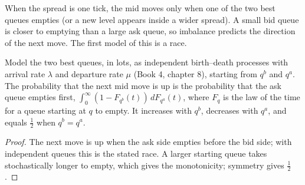 \begin{omfigure}

\label{fig:rs:order-book-features:book}
\end{omfigure}

When the spread is one tick, the mid moves only when one of the two best queues empties (or a new level appears inside a wider
spread). A small bid queue is closer to emptying than a large ask queue, so imbalance predicts the direction of the next move.
The first model of this is a race.

\begin{proposition}\label{prop:rs:order-book-features:race}
Model the two best queues, in lots, as independent birth--death processes with arrival rate $\lambda$ and departure rate $\mu$
(Book 4, chapter 8), starting from $q^b$ and $q^a$. The probability that the next mid move is up is the probability that the ask
queue empties first, $\int_0^\infty(1 - F_{q^b}(t))\,dF_{q^a}(t)$, where $F_q$ is the law of the time for a queue starting at $q$ to
empty. It increases with $q^b$, decreases with $q^a$, and equals $\tfrac12$ when $q^b = q^a$.
\end{proposition}

\begin{proof}
The next move is up when the ask side empties before the bid side; with independent queues this is the stated race. A larger
starting queue takes stochastically longer to empty, which gives the monotonicity; symmetry gives $\tfrac12$.
\end{proof}

